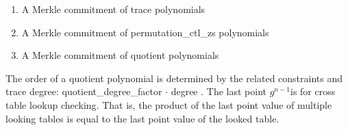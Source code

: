 \begin{enumerate}
    \item A Merkle commitment of trace polynomials
    \item A Merkle commitment of permutation\_ctl\_zs polynomials
    \item A Merkle commitment of quotient polynomials
\end{enumerate}

The order of a quotient polynomial is determined by the related constraints and trace degree: quotient\_degree\_factor $ \cdot $ degree . The last point $ g^{n-1} $is for cross table lookup checking. That is, the product of the last point value of multiple looking tables is equal to the last point value of the looked table.
